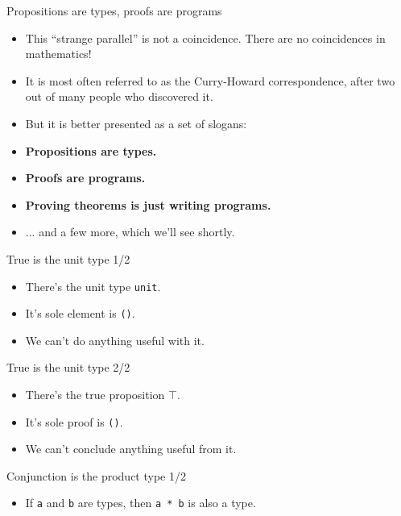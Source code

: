 \documentclass{beamer}
\newcommand{\m}[1]{\texttt{#1}}
\begin{document}
\begin{frame}{Propositions are types, proofs are programs}
\begin{itemize}
	\item This ``strange parallel'' is not a coincidence. There are no coincidences in mathematics!
	\item It is most often referred to as the Curry-Howard correspondence, after two out of many people who discovered it.
	\item But it is better presented as a set of slogans:
	\item \textbf{Propositions are types.}
	\item \textbf{Proofs are programs.}
	\item \textbf{Proving theorems is just writing programs.}
	\item ... and a few more, which we'll see shortly.
\end{itemize}
\end{frame}

\begin{frame}{True is the unit type 1/2}
\begin{itemize}
	\item There's the unit type \m{unit}.
	\item It's sole element is \m{()}.
	\item We can't do anything useful with it.
\end{itemize}
\end{frame}

\begin{frame}{True is the unit type 2/2}
\begin{itemize}
	\item There's the true proposition $\top$.
	\item It's sole proof is \m{()}.
	\item We can't conclude anything useful from it.
\end{itemize}
\end{frame}
	
\begin{frame}{Conjunction is the product type 1/2}
\begin{itemize}
	\item If \m{a} and \m{b} are types, then \m{a * b} is also a type.
\end{itemize}
\end{frame}
\end{document}
